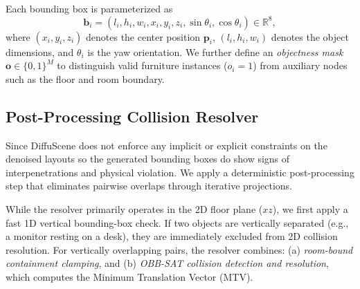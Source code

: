 Each bounding box is parameterized as
\begin{equation}
\mathbf{b}_i=(l_i,h_i,w_i,x_i,y_i,z_i,\sin\theta_i,\cos\theta_i)\in\mathbb{R}^{8},
\end{equation}
where $(x_i,y_i,z_i)$ denotes the center position $\mathbf{p}_i$, $(l_i,h_i,w_i)$ denotes the object dimensions, and $\theta_i$ is the yaw orientation. We further define an \emph{objectness mask} $\mathbf{o}\in\{0,1\}^{M}$ to distinguish valid furniture instances ($o_i=1$) from auxiliary nodes such as the floor and room boundary.

\subsection{Post-Processing Collision Resolver}
\label{sec:method:resolver}

Since DiffuScene does not enforce any implicit or explicit constraints on the denoised layouts so the generated bounding boxes do show signs of interpenetrations and physical violation. We apply a deterministic post-processing step that eliminates pairwise overlaps through iterative projections. 

While the resolver primarily operates in the 2D floor plane ($xz$), we first apply a fast 1D vertical bounding-box check. If two objects are vertically separated (e.g., a monitor resting on a desk), they are immediately excluded from 2D collision resolution. For vertically overlapping pairs, the resolver combines:
(a) \emph{room-bound containment clamping}, and 
(b) \emph{OBB-SAT collision detection and resolution}, which computes the Minimum Translation Vector (MTV).

